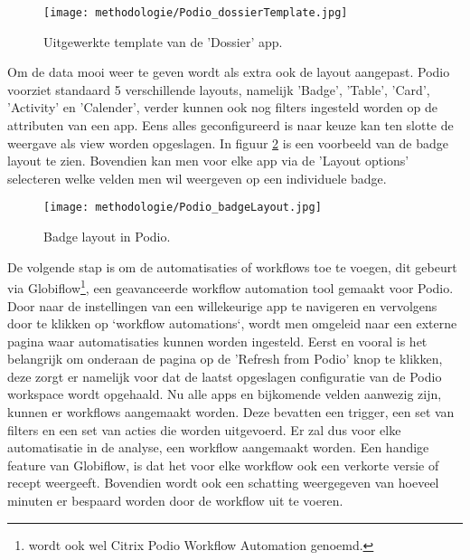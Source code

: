 \begin{figure}[ht]
    \centering
    \texttt{[image: methodologie/Podio\_dossierTemplate.jpg]}
    \caption{Uitgewerkte template van de 'Dossier' app.}
    \label{fig:meth_podio_dossierTemplate}
\end{figure}

Om de data mooi weer te geven wordt als extra ook de layout aangepast. Podio voorziet standaard 5 verschillende layouts, namelijk 'Badge', 'Table', 'Card', 'Activity' en 'Calender', verder kunnen ook nog filters ingesteld worden op de attributen van een app. Eens alles geconfigureerd is naar keuze kan ten slotte de weergave als view worden opgeslagen. In figuur \ref{fig:meth_podio_badgeLayout} is een voorbeeld van de badge layout te zien. Bovendien kan men voor elke app via de 'Layout options' selecteren welke velden men wil weergeven op een individuele badge. \\

\begin{figure}[ht]
    \centering
    \texttt{[image: methodologie/Podio\_badgeLayout.jpg]}
    \caption{Badge layout in Podio.}
    \label{fig:meth_podio_badgeLayout}
\end{figure}

De volgende stap is om de automatisaties of workflows toe te voegen, dit gebeurt via Globiflow\footnote{wordt ook wel Citrix Podio Workflow Automation genoemd.}, een geavanceerde workflow automation tool gemaakt voor Podio. Door naar de instellingen van een willekeurige app te navigeren en vervolgens door te klikken op `workflow automations`, wordt men omgeleid naar een externe pagina waar automatisaties kunnen worden ingesteld. Eerst en vooral is het belangrijk om onderaan de pagina op de 'Refresh from Podio' knop te klikken, deze zorgt er namelijk voor dat de laatst opgeslagen configuratie van de Podio workspace wordt opgehaald. Nu alle apps en bijkomende velden aanwezig zijn, kunnen er workflows aangemaakt worden. Deze bevatten een trigger, een set van filters en een set van acties die worden uitgevoerd. Er zal dus voor elke automatisatie in de analyse, een workflow aangemaakt worden. Een handige feature van Globiflow, is dat het voor elke workflow ook een verkorte versie of recept weergeeft. Bovendien wordt ook een schatting weergegeven van hoeveel minuten er bespaard worden door de workflow uit te voeren. \\

